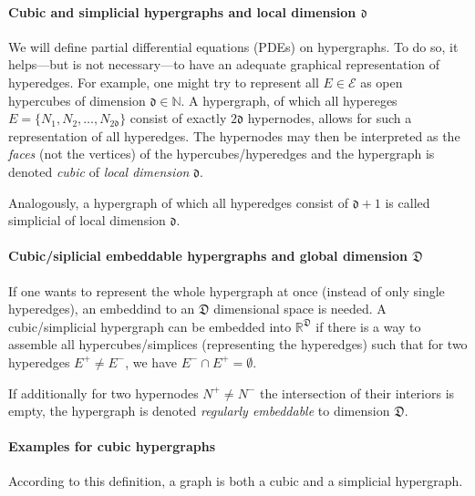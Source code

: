 \documentclass[a4paper, english, 12pt, reqno, draft]{amsart}
\theoremstyle{definition}
\theoremstyle{remark}
\numberwithin{equation}{section}
\newcommand{\setEdge}{\ensuremath{\mathcal E}}
\newcommand{\edge}{\ensuremath{E}}
\newcommand{\node}{\ensuremath{N}}
\newcommand{\locDim}{\ensuremath{\mathfrak d}}
\newcommand{\globDim}{\ensuremath{\mathfrak D}}
\newcommand{\IN}{\ensuremath{\mathbb N}}
\newcommand{\IR}{\ensuremath{\mathbb R}}
\begin{document}
\paragraph{Cubic and simplicial hypergraphs and local dimension $\locDim$}
% 
We will define partial differential equations (PDEs) on hypergraphs. To do so, it helps---but is not necessary---to have an adequate graphical representation of hyperedges. For example, one might try to represent all $\edge \in \setEdge$ as open hypercubes of dimension $\locDim \in \IN$. A hypergraph, of which all hypereges $\edge = \{ \node_1, \node_2, \ldots, \node_{2\locDim} \}$ consist of exactly $2\locDim$ hypernodes, allows for such a representation of all hyperedges. The hypernodes may then be interpreted as the \emph{faces} (not the vertices) of the hypercubes/hyperedges and the hypergraph is denoted \emph{cubic} of \emph{local dimension} $\locDim$.

Analogously, a hypergraph of which all hyperedges consist of $\locDim+1$ is called simplicial of local dimension $\locDim$.

\paragraph{Cubic/siplicial embeddable hypergraphs and global dimension $\globDim$}
% 
If one wants to represent the whole hypergraph at once (instead of only single hyperedges), an embeddind to an $\globDim$ dimensional space is needed. A cubic/simplicial hypergraph can be embedded into $\IR^\globDim$ if there is a way to assemble all hypercubes/simplices (representing the hyperedges) such that for two hyperedges $\edge^+ \neq \edge^-$, we have $\edge^- \cap \edge^+ = \emptyset$.

If additionally for two hypernodes $\node^+ \neq \node^-$ the intersection of their interiors is empty, the hypergraph is denoted \emph{regularly embeddable} to dimension $\globDim$.

\paragraph{Examples for cubic hypergraphs}
% 
According to this definition, a graph is both a cubic and a simplicial hypergraph.

\end{document}
